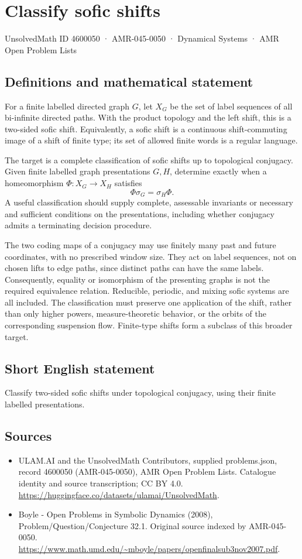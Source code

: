 \documentclass[11pt,a4paper]{article}
\begin{document}
\section*{Classify sofic shifts}\label{4600050}
{\small UnsolvedMath ID 4600050 · AMR-045-0050 · Dynamical Systems · AMR Open Problem Lists}
\subsection{Definitions and mathematical statement}
For a finite labelled directed graph $G$, let $X_G$ be the
set of label sequences of all bi-infinite directed paths.
With the product topology and the left shift, this is a
two-sided sofic shift. Equivalently, a sofic shift is a
continuous shift-commuting image of a shift of finite type;
its set of allowed finite words is a regular language.

The target is a complete classification of sofic shifts up
to topological conjugacy. Given finite labelled graph
presentations $G,H$, determine exactly when a homeomorphism
$\Phi:X_G\to X_H$ satisfies
\[
                       \Phi\sigma_G=\sigma_H\Phi.
\]
A useful classification should supply complete, assessable
invariants or necessary and sufficient conditions on the
presentations, including whether conjugacy admits a terminating
decision procedure.

The two coding maps of a conjugacy may use finitely many
past and future coordinates, with no prescribed window size.
They act on label sequences, not on chosen lifts to edge
paths, since distinct paths can have the same labels.
Consequently, equality or isomorphism of the presenting graphs
is not the required equivalence relation. Reducible, periodic,
and mixing sofic systems are all included. The classification
must preserve one application of the shift, rather than only
higher powers, measure-theoretic behavior, or the orbits of
the corresponding suspension flow. Finite-type shifts form
a subclass of this broader target.
\subsection{Short English statement}
Classify two-sided sofic shifts under topological conjugacy, using their finite labelled presentations.
\subsection{Sources}
\begin{itemize}
\item[S1] ULAM.AI and the UnsolvedMath Contributors, supplied problems.json, record 4600050 (AMR-045-0050), AMR Open Problem Lists. Catalogue identity and source transcription; CC BY 4.0.
\url{https://huggingface.co/datasets/ulamai/UnsolvedMath}.
\item[S2] Boyle - Open Problems in Symbolic Dynamics (2008), Problem/Question/Conjecture 32.1. Original source indexed by AMR-045-0050.
\url{https://www.math.umd.edu/~mboyle/papers/openfinalsub3nov2007.pdf}.
\end{itemize}
\end{document}
